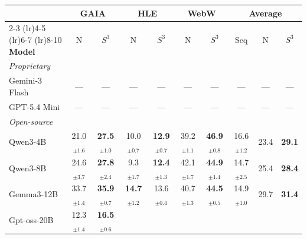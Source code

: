 \begin{table}[t]
\centering
\small
\setlength{\tabcolsep}{4pt}
\renewcommand{\arraystretch}{1.05}
\begin{tabular}{l *{6}{c} c *{2}{c}}
\toprule
& \multicolumn{2}{c}{GAIA} & \multicolumn{2}{c}{HLE}
& \multicolumn{2}{c}{WebW} & \multicolumn{3}{c}{Average} \\
\cmidrule(lr){2-3} \cmidrule(lr){4-5} \cmidrule(lr){6-7}
\cmidrule(lr){8-10}
\textbf{Model}
& N & $S^3$ & N & $S^3$ & N & $S^3$
& Seq & N & $S^3$ \\
\midrule
\multicolumn{10}{l}{\textit{Proprietary}} \\
Gemini-3 Flash
& \multicolumn{1}{c}{---}
& \multicolumn{1}{c}{---}
& \multicolumn{1}{c}{---}
& \multicolumn{1}{c}{---}
& \multicolumn{1}{c}{---}
& \multicolumn{1}{c}{---}
& \multicolumn{1}{c}{---}
& \multicolumn{1}{c}{---}
& \multicolumn{1}{c}{---} \\
GPT-5.4 Mini
& \multicolumn{1}{c}{---}
& \multicolumn{1}{c}{---}
& \multicolumn{1}{c}{---}
& \multicolumn{1}{c}{---}
& \multicolumn{1}{c}{---}
& \multicolumn{1}{c}{---}
& \multicolumn{1}{c}{---}
& \multicolumn{1}{c}{---}
& \multicolumn{1}{c}{---} \\
\midrule
\multicolumn{10}{l}{\textit{Open-source}} \\
Qwen3-4B
& \cellcolor{naivetint}21.0$_{\pm 1.6}$ & \cellcolor{s3tint}\textbf{27.5}$_{\pm 1.0}$
& \cellcolor{naivetint}10.0$_{\pm 0.7}$ & \cellcolor{s3tint}\textbf{12.9}$_{\pm 0.7}$
& \cellcolor{naivetint}39.2$_{\pm 1.1}$ & \cellcolor{s3tint}\textbf{46.9}$_{\pm 0.8}$
& 16.6$_{\pm 1.2}$
& \cellcolor{naivetint}23.4 & \cellcolor{s3tint}\textbf{29.1} \\
Qwen3-8B
& \cellcolor{naivetint}24.6$_{\pm 3.7}$ & \cellcolor{s3tint}\textbf{27.8}$_{\pm 2.4}$
& \cellcolor{naivetint}9.3$_{\pm 1.7}$ & \cellcolor{s3tint}\textbf{12.4}$_{\pm 1.3}$
& \cellcolor{naivetint}42.1$_{\pm 1.7}$ & \cellcolor{s3tint}\textbf{44.9}$_{\pm 1.4}$
& 14.7$_{\pm 2.5}$
& \cellcolor{naivetint}25.4 & \cellcolor{s3tint}\textbf{28.4} \\
Gemma3-12B
& \cellcolor{naivetint}33.7$_{\pm 1.4}$ & \cellcolor{s3tint}\textbf{35.9}$_{\pm 0.7}$
& \cellcolor{naivetint}\textbf{14.7}$_{\pm 1.2}$ & \cellcolor{s3tint}13.6$_{\pm 0.4}$
& \cellcolor{naivetint}40.7$_{\pm 1.3}$ & \cellcolor{s3tint}\textbf{44.5}$_{\pm 0.5}$
& 14.9$_{\pm 1.0}$
& \cellcolor{naivetint}29.7 & \cellcolor{s3tint}\textbf{31.4} \\
Gpt-oss-20B
& \cellcolor{naivetint}12.3$_{\pm 1.4}$ & \cellcolor{s3tint}\textbf{16.5}$_{\pm 0.6}$

\end{tabular}
\end{table}
